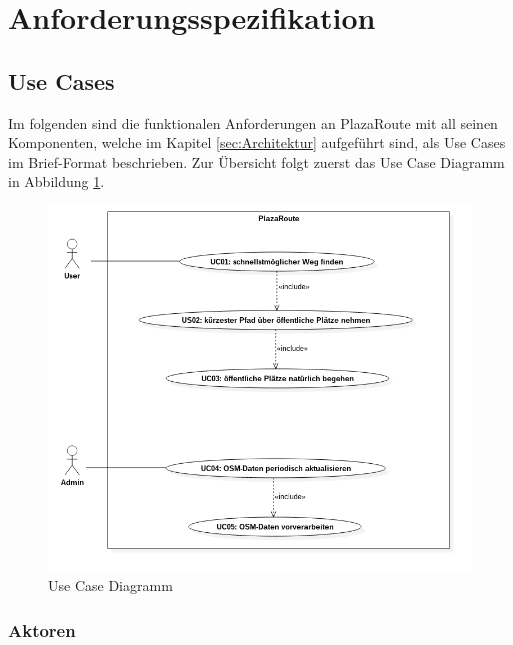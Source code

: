 \section{Anforderungsspezifikation}
\label{sec:Anforderungsspezifikation}

\subsection{Use Cases}
\label{sub:Use Cases}
Im folgenden sind die funktionalen Anforderungen an PlazaRoute mit all seinen Komponenten, welche im Kapitel \ref{sec:Architektur} aufgeführt sind, als Use Cases im Brief-Format beschrieben. Zur Übersicht folgt zuerst das Use Case Diagramm in Abbildung \ref{fig:usecase_diagram}.

\begin{figure}[ht]
\centering
\includegraphics[width=1\linewidth]{projectdoc/img/usecase_diagram}
\caption[Use Case Diagramm]{Use Case Diagramm}
\label{fig:usecase_diagram}
\end{figure}

\subsubsection{Aktoren}
\label{uc:Aktoren}

